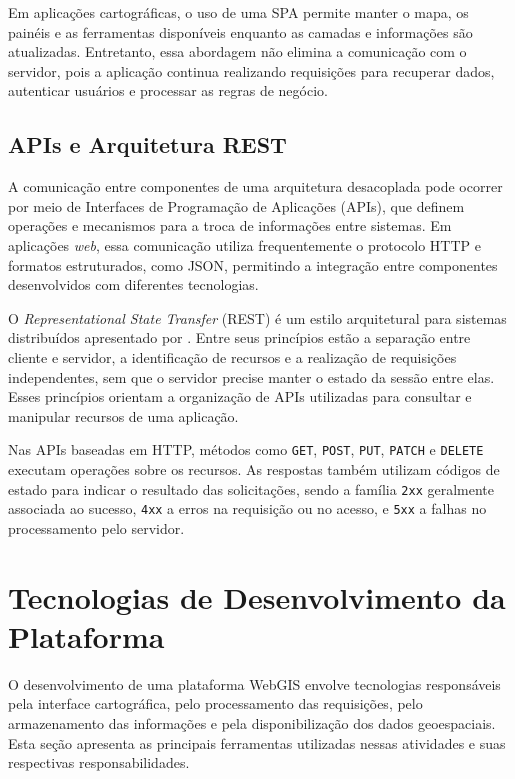 Em aplicações cartográficas, o uso de uma \gls{SPA} permite manter o mapa, os painéis e as ferramentas disponíveis enquanto as camadas e informações são atualizadas. Entretanto, essa abordagem não elimina a comunicação com o servidor, pois a aplicação continua realizando requisições para recuperar dados, autenticar usuários e processar as regras de negócio.

\subsection{APIs e Arquitetura REST}
\label{sec:api-rest}

A comunicação entre componentes de uma arquitetura desacoplada pode ocorrer por meio de Interfaces de Programação de Aplicações (APIs), que definem operações e mecanismos para a troca de informações entre sistemas. Em aplicações \textit{web}, essa comunicação utiliza frequentemente o protocolo \gls{HTTP} e formatos estruturados, como \gls{JSON}, permitindo a integração entre componentes desenvolvidos com diferentes tecnologias.

O \textit{Representational State Transfer} (REST) é um estilo arquitetural para sistemas distribuídos apresentado por .  Entre seus princípios estão a separação entre cliente e servidor, a identificação de recursos e a realização de requisições independentes, sem que o servidor precise manter o estado da sessão entre elas. Esses princípios orientam a organização de APIs utilizadas para consultar e manipular recursos de uma aplicação.

Nas APIs baseadas em \gls{HTTP}, métodos como \texttt{GET}, \texttt{POST}, \texttt{PUT}, \texttt{PATCH} e \texttt{DELETE} executam operações sobre os recursos. As respostas também utilizam códigos de estado para indicar o resultado das solicitações, sendo a família \texttt{2xx} geralmente associada ao sucesso, \texttt{4xx} a erros na requisição ou no acesso, e \texttt{5xx} a falhas no processamento pelo servidor.

\section{Tecnologias de Desenvolvimento da Plataforma}
\label{sec:tecnologias}

O desenvolvimento de uma plataforma \gls{WebGIS} envolve tecnologias responsáveis pela interface cartográfica, pelo processamento das requisições, pelo armazenamento das informações e pela disponibilização dos dados geoespaciais. Esta seção apresenta as principais ferramentas utilizadas nessas atividades e suas respectivas responsabilidades.

